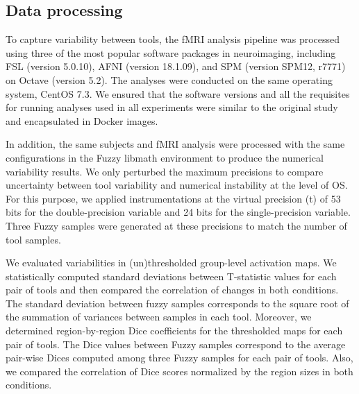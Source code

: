 \documentclass[conference]{IEEEtran}
\begin{document}
\subsection{Data processing}

To capture variability between tools, the fMRI analysis pipeline was processed using three of the most popular software
packages in neuroimaging, including FSL (version 5.0.10), AFNI (version 18.1.09), and SPM (version SPM12, r7771)
on Octave (version 5.2). The analyses were conducted on the same operating system, CentOS 7.3.
We ensured that the software versions and all the requisites for running analyses used in all experiments 
were similar to the original study and encapsulated in Docker images.

In addition, the same subjects and fMRI analysis were processed with the same configurations in the Fuzzy libmath environment
to produce the numerical variability results.
We only perturbed the maximum precisions to compare uncertainty between tool variability and numerical instability at the level of OS.
For this purpose, we applied instrumentations at the virtual precision (t) of 53 bits for the double-precision variable
and 24 bits for the single-precision variable. Three Fuzzy samples were generated at these precisions to match the number of tool samples.

We evaluated variabilities in (un)thresholded group-level activation maps.
We statistically computed standard deviations between T-statistic values for each pair of tools
and then compared the correlation of changes in both conditions.
The standard deviation between fuzzy samples corresponds to the square root of the summation of variances between samples in each tool.
Moreover, we determined region-by-region Dice coefficients for the thresholded maps for each pair of tools.
The Dice values between Fuzzy samples correspond to the average pair-wise Dices computed among three Fuzzy samples
for each pair of tools.
Also, we compared the correlation of Dice scores normalized by the region sizes in both conditions.
\end{document}
